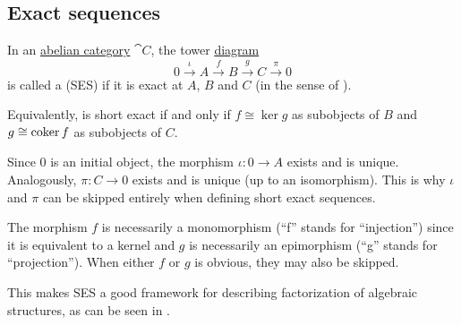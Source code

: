\subsection{Exact sequences}\label{subsec:exact_sequences}

\begin{definition}\label{def:short_exact_sequence}
  In an \hyperref[def:abelian_category]{abelian category} \( \cat{C} \), the tower \hyperref[def:tower_diagram]{diagram}
  \begin{equation}\label{def:short_exact_sequence/diagram}
    0
    \overset \iota \longrightarrow
    A
    \overset f \longrightarrow
    B
    \overset g \longrightarrow
    C
    \overset \pi \longrightarrow
    0
  \end{equation}
  is called a  (SES) if it is exact at \( A \), \( B \) and \( C \) (in the sense of ).

  Equivalently,  is short exact if and only if \( f \cong \ker g \) as subobjects of \( B \) and \( g \cong \operatorname*{co\!\ker} f \) as subobjects of \( C \).
\end{definition}

\begin{remark}\label{rem:short_exact_sequence_factorization}
  Since \( 0 \) is an initial object, the morphism \( \iota: 0 \to A \) exists and is unique. Analogously, \( \pi: C \to 0 \) exists and is unique (up to an isomorphism). This is why \( \iota \) and \( \pi \) can be skipped entirely when defining short exact sequences.

  The morphism \( f \) is necessarily a monomorphism (\enquote{f} stands for \enquote{injection}) since it is equivalent to a kernel and \( g \) is necessarily an epimorphism (\enquote{g} stands for \enquote{projection}). When either \( f \) or \( g \) is obvious, they may also be skipped.

  This makes SES a good framework for describing factorization of algebraic structures, as can be seen in .
\end{remark}

